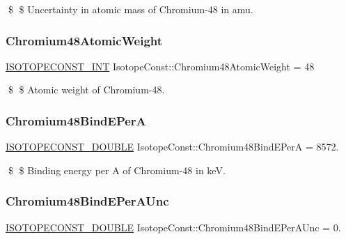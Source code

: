 \$ \$ Uncertainty in atomic mass of Chromium-\/48 in amu. \mbox{\label{group___isotope_const-_chromium-_cr48_gac917ae9e169959da1f44bed4640537b6}} 
\subsubsection{\texorpdfstring{Chromium48\+Atomic\+Weight}{Chromium48AtomicWeight}}
{\footnotesize\ttfamily \mbox{\hyperlink{group___isotope_const-_macros_ga5f18360b3e99483a35c32d789e62621c}{I\+S\+O\+T\+O\+P\+E\+C\+O\+N\+S\+T\+\_\+\+I\+NT}} Isotope\+Const\+::\+Chromium48\+Atomic\+Weight = 48}

\$ \$ Atomic weight of Chromium-\/48. \mbox{\label{group___isotope_const-_chromium-_cr48_gac1007dc0ec883491c2c2189cfcac54ee}} 
\subsubsection{\texorpdfstring{Chromium48\+Bind\+E\+PerA}{Chromium48BindEPerA}}
{\footnotesize\ttfamily \mbox{\hyperlink{group___isotope_const-_macros_ga8f45a7272ce02c0b4c65c44636ed719a}{I\+S\+O\+T\+O\+P\+E\+C\+O\+N\+S\+T\+\_\+\+D\+O\+U\+B\+LE}} Isotope\+Const\+::\+Chromium48\+Bind\+E\+PerA = 8572.}

\$ \$ Binding energy per A of Chromium-\/48 in keV. \mbox{\label{group___isotope_const-_chromium-_cr48_ga07097e53fd2d615d346c0c5952450637}} 
\subsubsection{\texorpdfstring{Chromium48\+Bind\+E\+Per\+A\+Unc}{Chromium48BindEPerAUnc}}
{\footnotesize\ttfamily \mbox{\hyperlink{group___isotope_const-_macros_ga8f45a7272ce02c0b4c65c44636ed719a}{I\+S\+O\+T\+O\+P\+E\+C\+O\+N\+S\+T\+\_\+\+D\+O\+U\+B\+LE}} Isotope\+Const\+::\+Chromium48\+Bind\+E\+Per\+A\+Unc = 0.}

